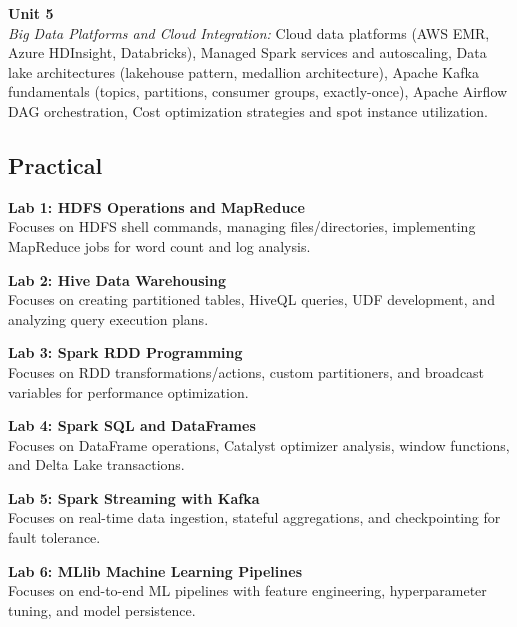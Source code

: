\vspace{0.3cm}

\noindent\textbf{Unit 5} \\
\textit{Big Data Platforms and Cloud Integration:} Cloud data platforms (AWS EMR, Azure HDInsight, Databricks), Managed Spark services and autoscaling, Data lake architectures (lakehouse pattern, medallion architecture), Apache Kafka fundamentals (topics, partitions, consumer groups, exactly-once), Apache Airflow DAG orchestration, Cost optimization strategies and spot instance utilization.

\newpage

\subsection*{Practical}
\noindent\textbf{Lab 1: HDFS Operations and MapReduce} \\
Focuses on HDFS shell commands, managing files/directories, implementing MapReduce jobs for word count and log analysis.

\vspace{0.2cm}

\noindent\textbf{Lab 2: Hive Data Warehousing} \\
Focuses on creating partitioned tables, HiveQL queries, UDF development, and analyzing query execution plans.

\vspace{0.2cm}

\noindent\textbf{Lab 3: Spark RDD Programming} \\
Focuses on RDD transformations/actions, custom partitioners, and broadcast variables for performance optimization.

\vspace{0.2cm}

\noindent\textbf{Lab 4: Spark SQL and DataFrames} \\
Focuses on DataFrame operations, Catalyst optimizer analysis, window functions, and Delta Lake transactions.

\vspace{0.2cm}

\noindent\textbf{Lab 5: Spark Streaming with Kafka} \\
Focuses on real-time data ingestion, stateful aggregations, and checkpointing for fault tolerance.

\vspace{0.2cm}

\noindent\textbf{Lab 6: MLlib Machine Learning Pipelines} \\
Focuses on end-to-end ML pipelines with feature engineering, hyperparameter tuning, and model persistence.

